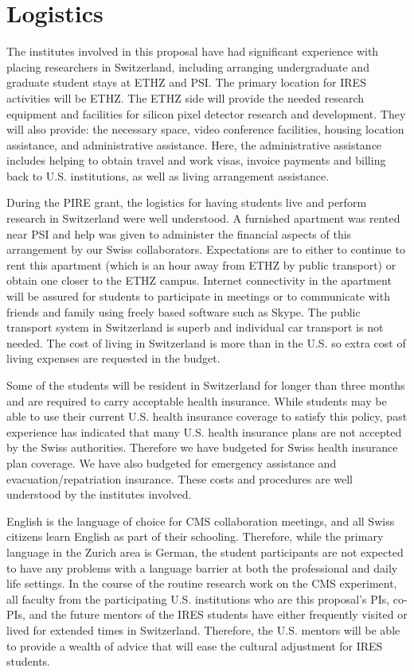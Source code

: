 
\section{Logistics}

%
The institutes involved in this proposal have had significant
experience with placing researchers in Switzerland, including
arranging undergraduate and graduate student stays at ETHZ and
PSI. The primary location for IRES activities will be ETHZ. The ETHZ
side will provide the needed research equipment and facilities for
silicon pixel detector research and development.  They will also
provide: the necessary space, video conference facilities, housing
location assistance, and administrative assistance.  Here, the
administrative assistance
includes helping to obtain travel and work visas, invoice payments and
billing back to U.S. institutions, as well as living arrangement
assistance.

%
During the PIRE grant, the logistics for having students live and
perform research in Switzerland were well understood.  A furnished
apartment was rented near PSI and help was given to administer the
financial aspects of this arrangement by our Swiss collaborators.
Expectations are to either to continue to rent this apartment (which
is an hour away from ETHZ by public transport) or obtain one closer to
the ETHZ campus.  Internet connectivity in the apartment will be
assured for students to participate in meetings or to communicate with
friends and family using freely based software such as Skype.  The
public transport system in Switzerland is superb and individual car
transport is not needed.  The cost of living in Switzerland is more
than in the U.S. so extra cost of living expenses are requested in the
budget.

%
Some of the students will be resident in Switzerland for longer than
three months and are required to carry acceptable health insurance.
While students may be able to use their current U.S. health insurance
coverage to satisfy this policy, past experience has indicated that
many U.S. health insurance plans are not accepted by the Swiss
authorities.  Therefore we have budgeted for Swiss health insurance
plan coverage. We have also budgeted for emergency assistance and
evacuation/repatriation insurance.  These costs and procedures are
well understood by the institutes involved.

%
English is the language of choice for CMS collaboration meetings, and
all Swiss citizens learn English as part of their schooling.
Therefore, while the primary language in the Zurich area is German,
the student participants are not expected to have any problems with a
language barrier at both the professional and daily life settings. In
the course of the routine research work on the CMS experiment, all
faculty from the participating U.S. institutions who are this proposal's
PIs, co-PIs, and the future mentors of the IRES students have either
frequently visited or lived for extended times in
Switzerland. Therefore, the U.S. mentors will be able to provide a
wealth of advice that will ease the cultural adjustment for IRES
students.

